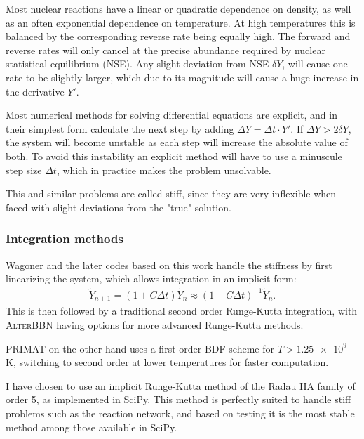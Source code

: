 Most nuclear reactions have a linear or quadratic dependence on density, as well as an often exponential dependence on temperature. At high temperatures this is balanced by the corresponding reverse rate being equally high. The forward and reverse rates will only cancel at the precise abundance required by nuclear statistical equilibrium (NSE). Any slight deviation from NSE $\delta Y$, will cause one rate to be slightly larger, which due to its magnitude will cause a huge increase in the derivative $Y'$.

Most numerical methods for solving differential equations are explicit, and in their simplest form calculate the next step by adding  $\Delta Y = \Delta t \cdot Y' $. 
If $\Delta Y>2\delta Y$, the system will become unstable as each step will increase the absolute value of both. To avoid this instability an explicit method will have to use a minuscule step size $\Delta t$, which in practice makes the problem unsolvable. 

This and similar problems are called stiff, since they are very inflexible when faced with slight deviations from the "true" solution. 


\subsubsection{Integration methods}

Wagoner and the later codes based on this work handle the stiffness by first linearizing the system, which allows integration in an implicit form:
\begin{align}
    \tilde{Y}_{n+1}=(1+C \Delta t)\tilde{Y}_{n}\approx(1-C \Delta t)^{-1}\tilde{Y}_{n}.
\end{align}
This is then followed by a traditional second order Runge-Kutta integration, with \textsc{AlterBBN} having options for more advanced Runge-Kutta methods. 

PRIMAT on the other hand uses a first order BDF scheme for $T>\num{1.25e9}$ K, switching to second order at lower temperatures for faster computation.

I have chosen to use an implicit Runge-Kutta method of the Radau IIA family of order 5, as implemented in SciPy\cite{SciPy}. This method is perfectly suited to handle stiff problems such as the reaction network, and based on testing it is the most stable method among those available in SciPy.

